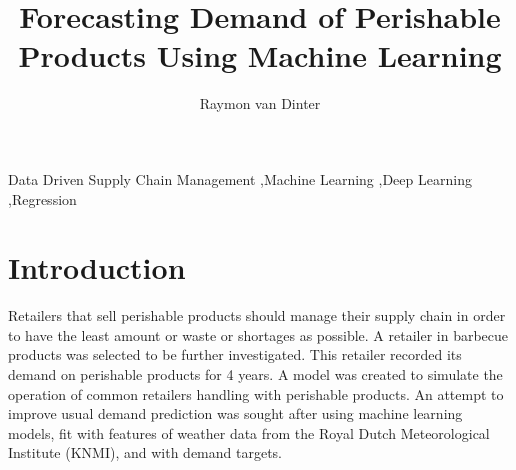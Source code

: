 \documentclass[final,authoryear,5p,times,twocolumn, 12pt]{elsarticle}
\begin{document}
\begin{frontmatter}



\title{Forecasting Demand of Perishable Products Using Machine Learning}


\author{Raymon van Dinter}
\address{ORL-33806\\Data Driven Supply Chain Management\\Wageningen University and Research}

\begin{abstract}
\end{abstract}

\begin{keyword}
Data Driven Supply Chain Management \sep Machine Learning \sep Deep Learning \sep Regression

\end{keyword}

\end{frontmatter}


\section{Introduction}
\label{sec:introduction}
Retailers that sell perishable products should manage their supply chain in order to have the least amount or waste or shortages as possible. A retailer in barbecue products was selected to be further investigated. This retailer recorded its demand on perishable products for 4 years. A model was created to simulate the operation of common retailers handling with perishable products. An attempt to improve usual demand prediction was sought after using machine learning models, fit with features of weather data from the Royal Dutch Meteorological Institute (KNMI), and with demand targets.
\end{document}
